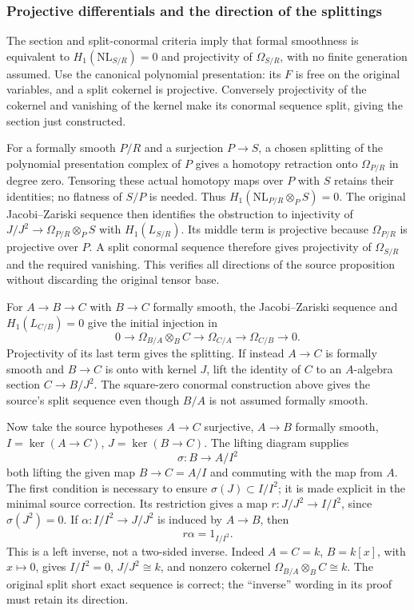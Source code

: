 \subsubsection{Projective differentials and the direction of the splittings}\label{projective-differentials-and-the-direction-of-the-splittings}

The section and split-conormal criteria imply that formal smoothness is equivalent to \(H_1(\mathrm{NL}_{S/R})=0\) and projectivity of \(\Omega_{S/R}\), with no finite generation assumed. Use the canonical polynomial presentation: its \(F\) is free on the original variables, and a split cokernel is projective. Conversely projectivity of the cokernel and vanishing of the kernel make its conormal sequence split, giving the section just constructed.

For a formally smooth \(P/R\) and a surjection \(P\to S\), a chosen splitting of the polynomial presentation complex of \(P\) gives a homotopy retraction onto \(\Omega_{P/R}\) in degree zero. Tensoring these actual homotopy maps over \(P\) with \(S\) retains their identities; no flatness of \(S/P\) is needed. Thus \(H_1(\mathrm{NL}_{P/R}\otimes_PS)=0\). The original Jacobi--Zariski sequence then identifies the obstruction to injectivity of \(J/J^2\to\Omega_{P/R}\otimes_PS\) with \(H_1(L_{S/R})\). Its middle term is projective because \(\Omega_{P/R}\) is projective over \(P\). A split conormal sequence therefore gives projectivity of \(\Omega_{S/R}\) and the required vanishing. This verifies all directions of the source proposition without discarding the original tensor base.

For \(A\to B\to C\) with \(B\to C\) formally smooth, the Jacobi--Zariski sequence and \(H_1(L_{C/B})=0\) give the initial injection in \[
0\longrightarrow\Omega_{B/A}\otimes_BC\longrightarrow
\Omega_{C/A}\longrightarrow\Omega_{C/B}\longrightarrow0.
\] Projectivity of its last term gives the splitting. If instead \(A\to C\) is formally smooth and \(B\to C\) is onto with kernel \(J\), lift the identity of \(C\) to an \(A\)-algebra section \(C\to B/J^2\). The square-zero conormal construction above gives the source's split sequence even though \(B/A\) is not assumed formally smooth.

Now take the source hypotheses \(A\to C\) surjective, \(A\to B\) formally smooth, \(I=\ker(A\to C)\), \(J=\ker(B\to C)\). The lifting diagram supplies \[
\sigma:B\longrightarrow A/I^2
\] both lifting the given map \(B\to C=A/I\) and commuting with the map from \(A\). The first condition is necessary to ensure \(\sigma(J)\subset I/I^2\); it is made explicit in the minimal source correction. Its restriction gives a map \(r:J/J^2\to I/I^2\), since \(\sigma(J^2)=0\). If \(\alpha:I/I^2\to J/J^2\) is induced by \(A\to B\), then \[
r\alpha=1_{I/I^2}.
\] This is a left inverse, not a two-sided inverse. Indeed \(A=C=k\), \(B=k[x]\), with \(x\mapsto0\), gives \(I/I^2=0\), \(J/J^2\cong k\), and nonzero cokernel \(\Omega_{B/A}\otimes_BC\cong k\). The original split short exact sequence is correct; the ``inverse'' wording in its proof must retain its direction.

